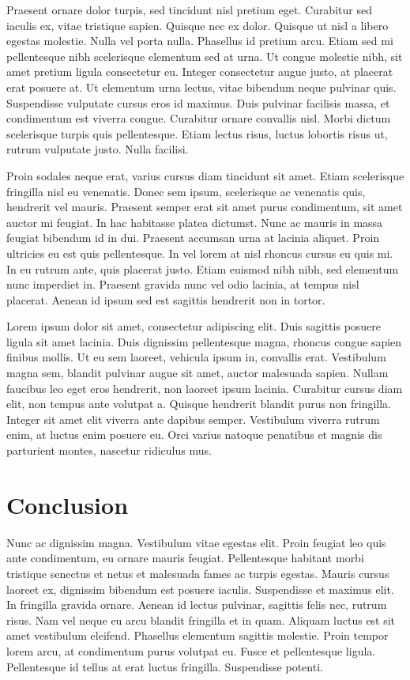 \documentclass[
  12pt,
]{article}
\begin{document}
Praesent ornare dolor turpis, sed tincidunt nisl pretium eget. Curabitur
sed iaculis ex, vitae tristique sapien. Quisque nec ex dolor. Quisque ut
nisl a libero egestas molestie. Nulla vel porta nulla. Phasellus id
pretium arcu. Etiam sed mi pellentesque nibh scelerisque elementum sed
at urna. Ut congue molestie nibh, sit amet pretium ligula consectetur
eu. Integer consectetur augue justo, at placerat erat posuere at. Ut
elementum urna lectus, vitae bibendum neque pulvinar quis. Suspendisse
vulputate cursus eros id maximus. Duis pulvinar facilisis massa, et
condimentum est viverra congue. Curabitur ornare convallis nisl. Morbi
dictum scelerisque turpis quis pellentesque. Etiam lectus risus, luctus
lobortis risus ut, rutrum vulputate justo. Nulla facilisi.

Proin sodales neque erat, varius cursus diam tincidunt sit amet. Etiam
scelerisque fringilla nisl eu venenatis. Donec sem ipsum, scelerisque ac
venenatis quis, hendrerit vel mauris. Praesent semper erat sit amet
purus condimentum, sit amet auctor mi feugiat. In hac habitasse platea
dictumst. Nunc ac mauris in massa feugiat bibendum id in dui. Praesent
accumsan urna at lacinia aliquet. Proin ultricies eu est quis
pellentesque. In vel lorem at nisl rhoncus cursus eu quis mi. In eu
rutrum ante, quis placerat justo. Etiam euismod nibh nibh, sed elementum
nunc imperdiet in. Praesent gravida nunc vel odio lacinia, at tempus
nisl placerat. Aenean id ipsum sed est sagittis hendrerit non in tortor.

Lorem ipsum dolor sit amet, consectetur adipiscing elit. Duis sagittis
posuere ligula sit amet lacinia. Duis dignissim pellentesque magna,
rhoncus congue sapien finibus mollis. Ut eu sem laoreet, vehicula ipsum
in, convallis erat. Vestibulum magna sem, blandit pulvinar augue sit
amet, auctor malesuada sapien. Nullam faucibus leo eget eros hendrerit,
non laoreet ipsum lacinia. Curabitur cursus diam elit, non tempus ante
volutpat a. Quisque hendrerit blandit purus non fringilla. Integer sit
amet elit viverra ante dapibus semper. Vestibulum viverra rutrum enim,
at luctus enim posuere eu. Orci varius natoque penatibus et magnis dis
parturient montes, nascetur ridiculus mus.

\section{Conclusion}\label{conclusion}

Nunc ac dignissim magna. Vestibulum vitae egestas elit. Proin feugiat
leo quis ante condimentum, eu ornare mauris feugiat. Pellentesque
habitant morbi tristique senectus et netus et malesuada fames ac turpis
egestas. Mauris cursus laoreet ex, dignissim bibendum est posuere
iaculis. Suspendisse et maximus elit. In fringilla gravida ornare.
Aenean id lectus pulvinar, sagittis felis nec, rutrum risus. Nam vel
neque eu arcu blandit fringilla et in quam. Aliquam luctus est sit amet
vestibulum eleifend. Phasellus elementum sagittis molestie. Proin tempor
lorem arcu, at condimentum purus volutpat eu. Fusce et pellentesque
ligula. Pellentesque id tellus at erat luctus fringilla. Suspendisse
potenti.
\end{document}
